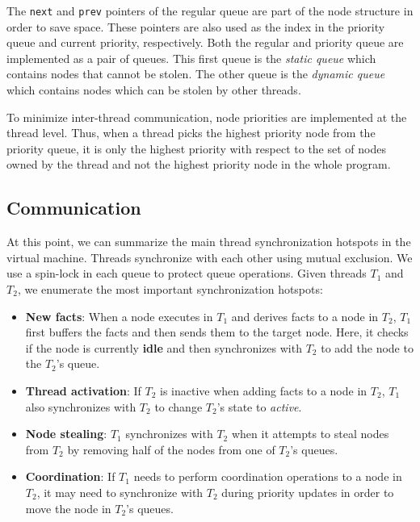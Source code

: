 The \texttt{next} and \texttt{prev} pointers of the regular queue are
part of the node structure in order to save space. These pointers are
also used as the index in the priority queue and current priority,
respectively. Both the regular and priority queue are implemented as a pair of
queues.  This first queue is the \emph{static queue} which
contains nodes that cannot be stolen.  The other queue is
the \emph{dynamic queue} which contains nodes which can be stolen by
other threads.

To minimize inter-thread communication, node priorities are
implemented at the thread level. Thus, when a thread picks the highest
priority node from the priority queue, it is only the highest priority
with respect to the set of nodes owned by the thread and not the
highest priority node in the whole program.  

\subsection{Communication}

At this point, we can summarize the main thread synchronization hotspots in the
virtual machine. Threads synchronize with each other using mutual exclusion. We
use a spin-lock in each queue to protect queue operations.  Given threads $T_1$
and $T_2$, we enumerate the most important synchronization hotspots:

\begin{itemize}

   \item \textbf{New facts}: When a node executes in $T_1$ and derives facts to
      a node in $T_2$, $T_1$ first buffers the facts and then sends them to the
      target node. Here, it checks if the node is currently \textbf{idle} and
      then synchronizes with $T_2$ to add the node to the $T_2$'s queue.

   \item \textbf{Thread activation}: If $T_2$ is inactive when adding facts to a
      node in $T_2$, $T_1$ also synchronizes with $T_2$ to change $T_2$'s state
      to \emph{active}.

   \item \textbf{Node stealing}: $T_1$ synchronizes with $T_2$ when it attempts
      to steal nodes from $T_2$ by removing half of the nodes from one of
      $T_2$'s queues.

   \item \textbf{Coordination}: If $T_1$ needs to perform coordination
      operations to a node in $T_2$, it may need to synchronize with $T_2$
      during priority updates in order to move the node in $T_2$'s queues.

\end{itemize}

